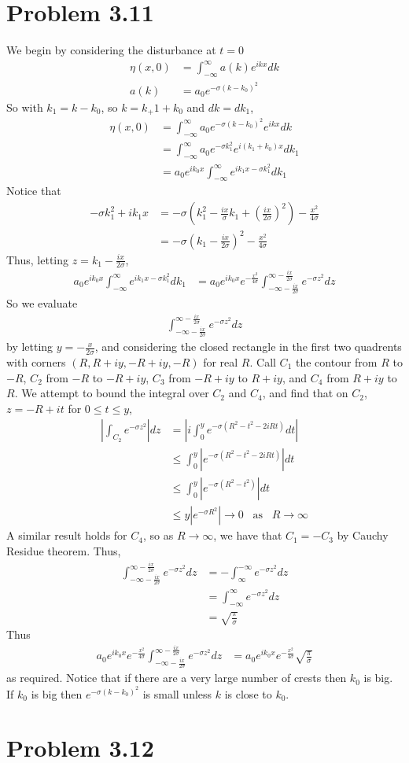 \documentclass[12pt]{article}
\newcommand{\eq}[1]{\begin{align*}#1\end{align*}}
\newcommand{\on}[1]{\operatorname{#1}}
\begin{document}
\section*{Problem 3.11}
We begin by considering the disturbance at $t = 0$
\eq{
	\eta(x,0) &= \int_{-\infty}^\infty a(k)e^{ikx}dk\\
	a(k) &= a_0 e^{-\sigma(k - k_0)^2}
}
So with $k_1 = k - k_0$, so $k = k_+1 + k_0$ and $dk = dk_1$,
\eq{
	\eta(x, 0) &= \int_{-\infty}^\infty a_0 e^{-\sigma(k - k_0)^2}e^{ikx}dk\\
	&= \int_{-\infty}^\infty a_0 e^{-\sigma k_1^2}e^{i(k_1 + k_0)x}dk_1\\
	&= a_0 e^{ik_0x}\int_{-\infty}^\infty e^{ik_1 x - \sigma k_1^2} dk_1
}
Notice that
\eq{
	-\sigma k_1^2 + ik_1x &= -\sigma(k_1^2 - \frac{ix}{\sigma}k_1 + \left(\frac{ix}{2\sigma}\right)^2) - \frac{x^2}{4\sigma}\\
	&= -\sigma(k_1 - \frac{ix}{2\sigma})^2 - \frac{x^2}{4\sigma}
}
Thus, letting $z = k_1 - \frac{ix}{2\sigma}$,
\eq{
	a_0 e^{ik_0x}\int_{-\infty}^\infty e^{ik_1 x - \sigma k_1^2} dk_1 &= a_0e^{ik_0 x}e^{-\frac{x^2}{4\sigma}}\int_{-\infty - \frac{ix}{2\sigma}}^{\infty - \frac{ix}{2\sigma}} e^{-\sigma z^2}dz
}
So we evaluate
\eq{
	\int_{-\infty - \frac{ix}{2\sigma}}^{\infty - \frac{ix}{2\sigma}} e^{-\sigma z^2}dz
}
by letting $y = -\frac{x}{2\sigma}$, and considering the closed rectangle in the first two quadrents with corners $(R, R+iy, -R+iy, -R)$ for real $R$. Call $C_1$ the contour from $R$ to $-R$, $C_2$ from $-R$ to $-R+iy$, $C_3$ from $-R+iy$ to $R+iy$, and $C_4$ from $R+iy$ to $R$. 
We attempt to bound the integral over $C_2$ and $C_4$, and find that on $C_2$, $z = -R+it$ for $0 \leq t \leq y$,
\eq{
	|\int_{C_2} e^{-\sigma z^2}| dz &= |i\int_0^y e^{-\sigma (R^2 - t^2 - 2iRt)} dt|\\
	&\leq \int_0^y |e^{-\sigma (R^2 - t^2 - 2iRt)}| dt\\
	&\leq \int_0^y |e^{-\sigma (R^2 - t^2)}| dt\\
	&\leq y|e^{-\sigma R^2}| \rightarrow 0\;\;\on{as}\;\;R\rightarrow\infty
}
A similar result holds for $C_4$, so as $R \rightarrow \infty$, we have that $C_1 = -C_3$ by Cauchy Residue theorem. Thus,
\eq{
	\int_{-\infty - \frac{ix}{2\sigma}}^{\infty - \frac{ix}{2\sigma}} e^{-\sigma z^2}dz &= -\int_{\infty}^{-\infty} e^{-\sigma z^2}dz \\
	&= \int_{-\infty}^{\infty} e^{-\sigma z^2}dz\\
	&= \sqrt{\frac{\pi}{\sigma}}
}
Thus
\eq{
	a_0e^{ik_0 x}e^{-\frac{x^2}{4\sigma}}\int_{-\infty - \frac{ix}{2\sigma}}^{\infty - \frac{ix}{2\sigma}} e^{-\sigma z^2}dz &= a_0e^{ik_0 x}e^{-\frac{x^2}{4\sigma}}\sqrt{\frac{\pi}{\sigma}}
}
as required. Notice that if there are a very large number of crests then $k_0$ is big. If $k_0$ is big then $e^{-\sigma(k - k_0)^2}$ is small unless $k$ is close to $k_0$.
\section*{Problem 3.12}
\end{document}
